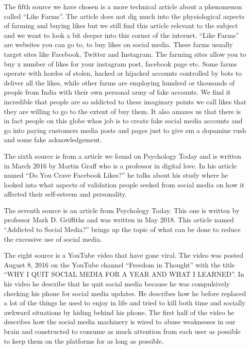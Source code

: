 \documentclass[11pt]{article}
\begin{document}
The fifth source \cite{benthamsgaze} we have chosen is a more technical article about
a phenomenon called “Like Farms”. The article does not dig much into the physiological
aspects of farming and buying likes but we still find this article relevant to the
subject and we want to look a bit deeper into this corner of the internet. “Like Farms”
are websites you can go to, to buy likes on social media. These farms usually target
sites like Facebook, Twitter and Instagram. The farming sites allow you to buy x number
of likes for your instagram post, facebook page etc. Some farms operate with hordes of
stolen, hacked or hijacked accounts controlled by bots to deliver all the likes, while
other farms are employing hundred or thousands of people from India with their own
personal army of fake accounts. We find it incredible that people are so addicted to
these imaginary points we call likes that they are willing to go to the extent of buy
them. It also amazes us that there is in fact people on this globe whos job is to create
fake social media accounts and go into paying customers media posts and pages just to
give em a dopamine rush and some fake acknowledgement.

The sixth source \cite{psychologytoday1} is from a article we found on Psychology Today
and is written in March 2016 by Martin Graff who is a professor in digital love. In his
article named “Do You Crave Facebook Likes?” he talks about his study where he looked
into what aspects of validation people seeked from social media on how it affected
their self-esteem and personality.

The seventh source \cite{psychologytoday2} is an article from Psychology Today. This
one is written by professor Mark D. Griffiths and was written in May 2018. This article
named “Addicted to Social Media?” brings up the topic of what can be done to reduce the
excessive use of social media.

The eight source \cite{youtube3} is a YouTube video that have gone viral. The video was
posted August 8, 2016 on the YouTube channel “Freedom in Thought” with the title “WHY I
QUIT SOCIAL MEDIA FOR A YEAR AND WHAT I LEARNED”. In his video he describe that he quit
social media because he was compulsively checking his phone for social media updates. He
describes how he before replaced a lot of the things he used to enjoy in life and tried
to kill both time and socially awkward situations by hiding behind his phone. The first
half of the video he describes how the social media machinery is wired to abuse
weaknesses in our brain and constructed to consume as much attention from each user as
possible to keep them on the platforms for as long as possible.
\end{document}
